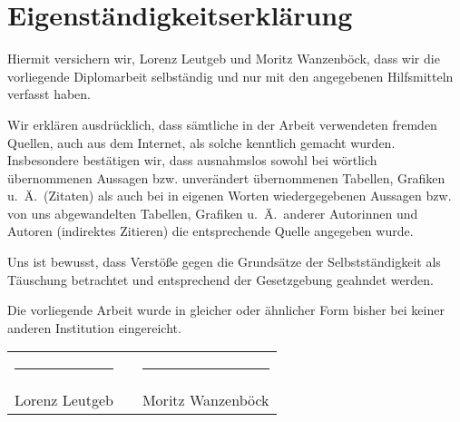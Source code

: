 \vspace*{\fill}
\section*{Eigenständigkeitserklärung}

Hiermit versichern wir, Lorenz Leutgeb und Moritz Wanzenböck, dass wir die vorliegende Diplomarbeit selbständig und nur mit den angegebenen Hilfsmitteln verfasst haben. 

Wir erklären ausdrücklich, dass sämtliche in der Arbeit verwendeten fremden Quellen, auch aus dem Internet, als solche kenntlich gemacht wurden. Insbesondere bestätigen wir, dass ausnahmslos sowohl bei wörtlich übernommenen Aussagen bzw. unverändert übernommenen Tabellen, Grafiken u.~Ä.\ (Zitaten) als auch bei in eigenen Worten wiedergegebenen Aussagen bzw. von uns abgewandelten Tabellen, Grafiken u.~Ä.\ anderer Autorinnen und Autoren (indirektes Zitieren) die entsprechende Quelle angegeben wurde.

Uns ist bewusst, dass Verstöße gegen die Grundsätze der Selbstständigkeit als Täuschung betrachtet und entsprechend der Gesetzgebung geahndet werden.

Die vorliegende Arbeit wurde in gleicher oder ähnlicher Form bisher bei keiner anderen Institution eingereicht.

\vspace{3cm}

\begin{center}
\begin{tabular}{ccc}
    \rule{0.4\textwidth}{0.5pt} & \hspace{5mm} & \rule{0.4\textwidth}{0.5pt} \\
    Lorenz Leutgeb & & Moritz Wanzenböck
\end{tabular}
\end{center}
\vspace*{\fill}
